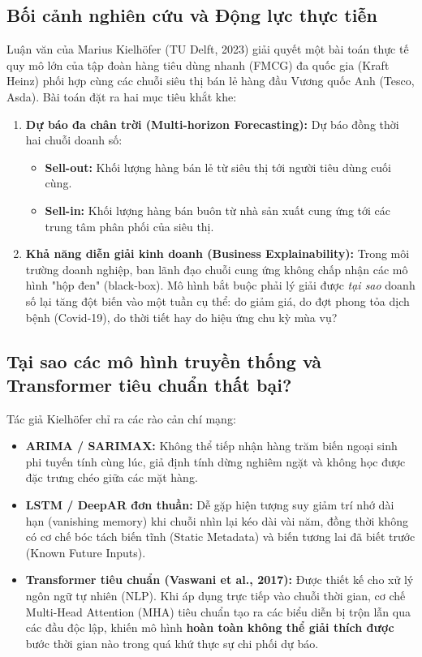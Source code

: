 \documentclass[12pt,a4paper,oneside]{article}
\begin{document}
\subsection{Bối cảnh nghiên cứu và Động lực thực tiễn}
Luận văn của Marius Kielh\"{o}fer (TU Delft, 2023) giải quyết một bài toán thực tế quy mô lớn của tập đoàn hàng tiêu dùng nhanh (FMCG) đa quốc gia (Kraft Heinz) phối hợp cùng các chuỗi siêu thị bán lẻ hàng đầu Vương quốc Anh (Tesco, Asda). Bài toán đặt ra hai mục tiêu khắt khe:
\begin{enumerate}
    \item \textbf{Dự báo đa chân trời (Multi-horizon Forecasting):} Dự báo đồng thời hai chuỗi doanh số:
    \begin{itemize}
        \item \textbf{Sell-out:} Khối lượng hàng bán lẻ từ siêu thị tới người tiêu dùng cuối cùng.
        \item \textbf{Sell-in:} Khối lượng hàng bán buôn từ nhà sản xuất cung ứng tới các trung tâm phân phối của siêu thị.
    \end{itemize}
    \item \textbf{Khả năng diễn giải kinh doanh (Business Explainability):} Trong môi trường doanh nghiệp, ban lãnh đạo chuỗi cung ứng không chấp nhận các mô hình "hộp đen" (black-box). Mô hình bắt buộc phải lý giải được \textit{tại sao} doanh số lại tăng đột biến vào một tuần cụ thể: do giảm giá, do đợt phong tỏa dịch bệnh (Covid-19), do thời tiết hay do hiệu ứng chu kỳ mùa vụ?
\end{enumerate}

\subsection{Tại sao các mô hình truyền thống và Transformer tiêu chuẩn thất bại?}
Tác giả Kielh\"{o}fer chỉ ra các rào cản chí mạng:
\begin{itemize}
    \item \textbf{ARIMA / SARIMAX:} Không thể tiếp nhận hàng trăm biến ngoại sinh phi tuyến tính cùng lúc, giả định tính dừng nghiêm ngặt và không học được đặc trưng chéo giữa các mặt hàng.
    \item \textbf{LSTM / DeepAR đơn thuần:} Dễ gặp hiện tượng suy giảm trí nhớ dài hạn (vanishing memory) khi chuỗi nhìn lại kéo dài vài năm, đồng thời không có cơ chế bóc tách biến tĩnh (Static Metadata) và biến tương lai đã biết trước (Known Future Inputs).
    \item \textbf{Transformer tiêu chuẩn (Vaswani et al., 2017):} Được thiết kế cho xử lý ngôn ngữ tự nhiên (NLP). Khi áp dụng trực tiếp vào chuỗi thời gian, cơ chế Multi-Head Attention (MHA) tiêu chuẩn tạo ra các biểu diễn bị trộn lẫn qua các đầu độc lập, khiến mô hình \textbf{hoàn toàn không thể giải thích được} bước thời gian nào trong quá khứ thực sự chi phối dự báo.
\end{itemize}
\end{document}
